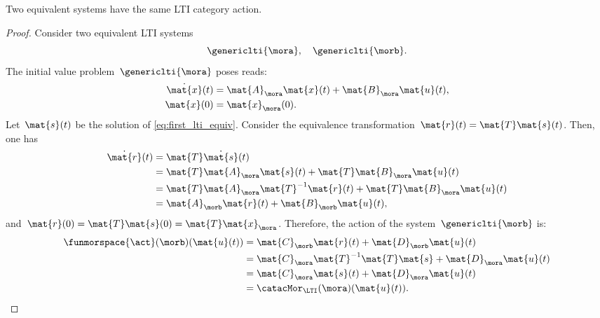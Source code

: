 \begin{lemma}
    \label{lem:equivsystequivact}
    Two equivalent systems have the same LTI category action.
\end{lemma}
\begin{proof}
    Consider two equivalent LTI systems
    \begin{equation*}
        \genericlti{\mora},\quad \genericlti{\morb}.
    \end{equation*}
    The initial value problem~$\genericlti{\mora}$ poses reads:
    \begin{equation}
        \label{eq:first_lti_equiv}
        \begin{aligned}
            \dot{\mat{x}}(t) & =\mat{A}_{\mora}\mat{x}(t)+\mat{B}_{\mora}\mat{u}(t), \\
            \mat{x}(0)       & =\mat{x}_\mora(0).
        \end{aligned}
    \end{equation}
    Let~$\mat{s}(t)$ be the solution of \cref{eq:first_lti_equiv}.
    Consider the equivalence transformation~$\mat{r}(t)=\mat{T}\mat{s}(t)$.
    Then, one has
    \begin{equation*}
        \begin{aligned}
            \dot{\mat{r}}(t) & =\mat{T}\dot{\mat{s}}(t) \\
                             & =\mat{T}\mat{A}_\mora \mat{s}(t)+\mat{T}\mat{B}_\mora \mat{u}(t) \\
                             & =\mat{T}\mat{A}_\mora \mat{T}^{-1}\mat{r}(t)+\mat{T}\mat{B}_\mora \mat{u}(t) \\
                             & =\mat{A}_\morb\mat{r}(t)+\mat{B}_\morb \mat{u}(t),
        \end{aligned}
    \end{equation*}
    and~$\mat{r}(0)=\mat{T}\mat{s}(0)=\mat{T}\mat{x}_\mora$.
    Therefore, the action of the system~$\genericlti{\morb}$ is:
    \begin{equation*}
        \begin{aligned}
            \funmorspace{\act}(\morb)(\mat{u}(t)) & =\mat{C}_\morb \mat{r}(t)+ \mat{D}_\morb \mat{u}(t) \\
                                                  & =\mat{C}_\mora \mat{T}^{-1}\mat{T}\mat{s}+\mat{D}_\mora \mat{u}(t) \\
                                                  & =\mat{C}_\mora \mat{s}(t)+\mat{D}_\mora \mat{u}(t) \\
                                                  & =\catacMor_\LTI(\mora)(\mat{u}(t)).
        \end{aligned}
    \end{equation*}
\end{proof}

